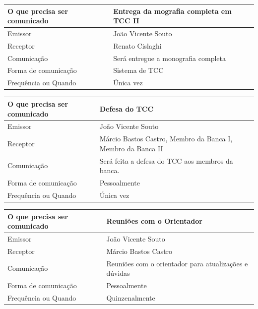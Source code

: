 \documentclass[
	12pt,				%
	openright,			%
	twoside,			%
	a4paper,			%
	english,			%
	brazil,				%
	]{abntex2}
\begin{document}
\begin{center}
\begin{tabular}{|l|p{9cm}|}
\hline
    O que precisa ser comunicado & Entrega da mografia completa em TCC II \\ \hline
    Emissor & João Vicente Souto \\ \hline
    Receptor & Renato Cislaghi \\ \hline
    Comunicação & Será entregue a monografia completa \\ \hline
    Forma de comunicação & Sistema de TCC \\ \hline
    Frequência ou Quando & Única vez \\ \hline
\end{tabular}
\end{center}

\begin{center}
\begin{tabular}{|l|p{9cm}|}
\hline
    O que precisa ser comunicado & Defesa do TCC \\ \hline
    Emissor & João Vicente Souto \\ \hline
    Receptor & Márcio Bastos Castro, Membro da Banca I, Membro da Banca II\\ \hline
    Comunicação & Será feita a defesa do TCC aos membros da banca.  \\ \hline
    Forma de comunicação & Pessoalmente \\ \hline
    Frequência ou Quando & Única vez \\ \hline
\end{tabular}
\end{center}

\begin{center}
\begin{tabular}{|l|p{9cm}|}
\hline
    O que precisa ser comunicado & Reuniões com o Orientador \\ \hline
    Emissor & João Vicente Souto \\ \hline
    Receptor & Márcio Bastos Castro \\ \hline
    Comunicação & Reuniões com o orientador para atualizações e dúvidas \\ \hline
    Forma de comunicação & Pessoalmente \\ \hline
    Frequência ou Quando & Quinzenalmente \\ \hline
\end{tabular}
\end{center}
\end{document}
